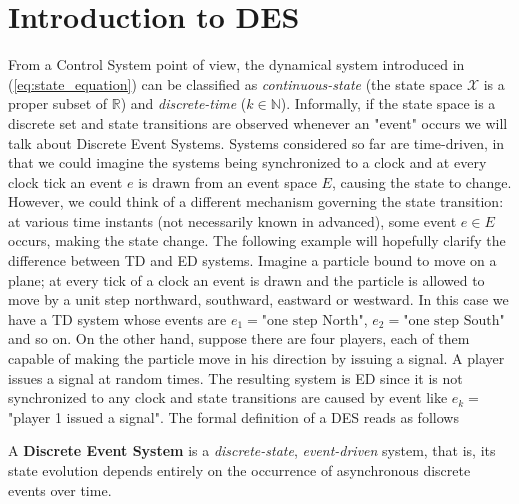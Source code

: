 \section{Introduction to DES }\label{sec:Introduction_to_DES}
From a Control System point of view, the dynamical system introduced in (\ref{eq:state_equation}) can be classified as \textit{continuous-state} (the state space $\mathcal{X}$ is a proper subset of $\mathbb{R}$) and \textit{discrete-time} ($k \in \mathbb{N}$). Informally, if the state space is a discrete set and state transitions are observed whenever an "event" occurs we will talk about Discrete Event Systems. Systems considered so far are time-driven, in that we could imagine the systems being synchronized to a clock and at every clock tick an event $e$ is drawn from an event space $E$, causing the state to change. However, we could think of a different mechanism governing the state transition: at various time instants (not necessarily known in advanced), some event $e \in E$ occurs, making the state change.
The following example will hopefully clarify the difference between \gls{TD} and \gls{ED} systems. Imagine a particle bound to move on a plane; at every tick of a clock an event is drawn and the particle is allowed to move by a unit step northward, southward, eastward or westward. In this case we have a \gls{TD} system whose events are $e_1= \text{"one step North"}$, $e_2= \text{"one step South"}$ and so on. On the other hand, suppose there are four players, each of them capable of making the particle move in his direction by issuing a signal. A player issues a signal at random times. The resulting system is \gls{ED} since it is not synchronized to any clock and state transitions are caused by event like $e_k=$"player 1 issued a signal". The formal definition of a \gls{DES} reads as follows
\begin{definition}
	A \textbf{Discrete Event System} is a \textit{discrete-state}, \textit{event-driven} system, that is, its state evolution depends entirely on the occurrence of asynchronous discrete events over time.
\end{definition} 


